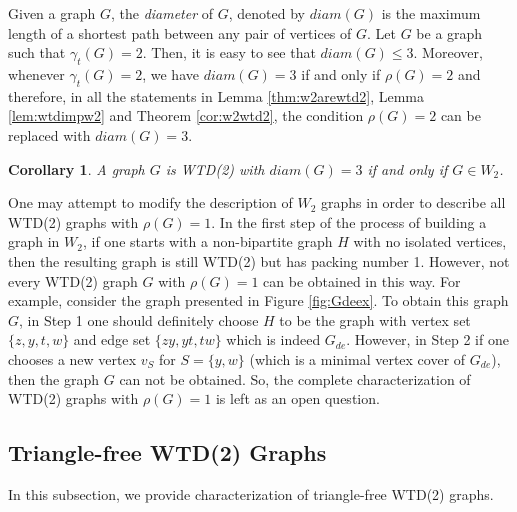 \documentclass[11pt]{article}
\newtheorem{corollary}[theorem]{Corollary}
\theoremstyle{definition}
\begin{document}
Given a graph $G$, the \textit{diameter} of $G$, denoted by $diam(G)$ is the maximum length of a shortest path between any pair of vertices of $G$.
Let $G$ be a graph such that $\gamma_t(G)=2$.
Then, it is easy to see that $diam(G) \leq 3$.
Moreover, whenever $\gamma_t(G)=2$, we have $diam(G)=3$ if and only if $\rho(G)=2$ and therefore,
in all the statements in Lemma \ref{thm:w2arewtd2}, Lemma \ref{lem:wtdimpw2} and Theorem \ref{cor:w2wtd2},
the condition $\rho(G)=2$ can be replaced with $diam(G)=3$.
\begin{corollary}
A graph $G$ is WTD(2) with $diam(G)=3$ if and only if $G\in W_2$.
\end{corollary}




One may attempt to modify the description of $W_2$ graphs in order to describe all WTD(2) graphs with $\rho(G)=1$.
In the first step of the process of building a graph in $W_2$,
if one starts with a non-bipartite graph $H$ with no isolated vertices,
then the resulting graph is still WTD(2) but has packing number 1.
However, not every WTD(2) graph $G$ with $\rho(G)=1$ can be obtained in this way.
For example, consider the graph presented in Figure \ref{fig:Gdeex}.
To obtain this graph $G$, 
in Step 1 one should definitely choose $H$ to be the graph with vertex set $\{z,y,t,w\}$ and edge set $\{zy,yt,tw\}$ which is indeed $G_{de}$.
However, in Step 2 if one chooses a new vertex $v_S$ for $S=\{y,w\}$ (which  is a minimal vertex cover of $G_{de}$), then the graph $G$ can not be obtained. So, the complete characterization of WTD(2) graphs with  $\rho(G)=1$ is left as an open question.


\subsection{Triangle-free WTD(2) Graphs} \label{sec:bipWTD}
In this subsection, we provide characterization of triangle-free WTD(2) graphs.
\end{document}
